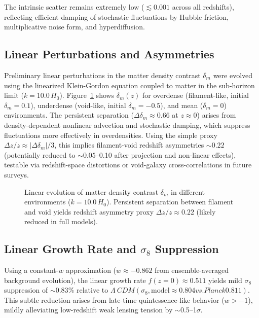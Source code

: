 \documentclass[preprint]{aastex7}
\begin{document}
The intrinsic scatter remains extremely low (\( \lesssim 0.001 \) across all redshifts), reflecting efficient damping of stochastic fluctuations by Hubble friction, multiplicative noise form, and hyperdiffusion.

\subsection{Linear Perturbations and Asymmetries}

Preliminary linear perturbations in the matter density contrast \( \delta_m \) were evolved using the linearized Klein-Gordon equation coupled to matter in the sub-horizon limit (\( k = 10.0\, H_0 \)). Figure~\ref{fig:pert_asym} shows \( \delta_m(z) \) for overdense (filament-like, initial \( \delta_m = 0.1 \)), underdense (void-like, initial \( \delta_m = -0.5 \)), and mean (\( \delta_m = 0 \)) environments. The persistent separation (\( \Delta \delta_m \approx 0.66 \) at \( z\approx 0 \)) arises from density-dependent nonlinear advection and stochastic damping, which suppress fluctuations more effectively in overdensities. Using the simple proxy \( \Delta z/z \approx |\Delta \delta_m|/3 \), this implies filament-void redshift asymmetries \( \sim 0.22 \) (potentially reduced to \( \sim 0.05 \)--0.10 after projection and non-linear effects), testable via redshift-space distortions or void-galaxy cross-correlations in future surveys.

\begin{figure}
\caption{Linear evolution of matter density contrast \( \delta_m \) in different environments (\( k = 10.0\, H_0 \)). Persistent separation between filament and void yields redshift asymmetry proxy \( \Delta z/z \approx 0.22 \) (likely reduced in full models).}
\label{fig:pert_asym}
\end{figure}

\subsection{Linear Growth Rate and \( \sigma_8 \) Suppression}

Using a constant-\( w \) approximation (\( w \approx -0.862 \) from ensemble-averaged background evolution), the linear growth rate \( f(z=0) \approx 0.511 \) yields mild \( \sigma_8 \) suppression of \( \sim 0.83\% \) relative to \(\Lambda\ CDM (\sigma_8,\mathrm{model} \approx 0.804 vs. Planck 0.811)\). This subtle reduction arises from late-time quintessence-like behavior (\( w > -1 \)), mildly alleviating low-redshift weak lensing tension by $\sim$0.5--1\( \sigma \).
\end{document}
